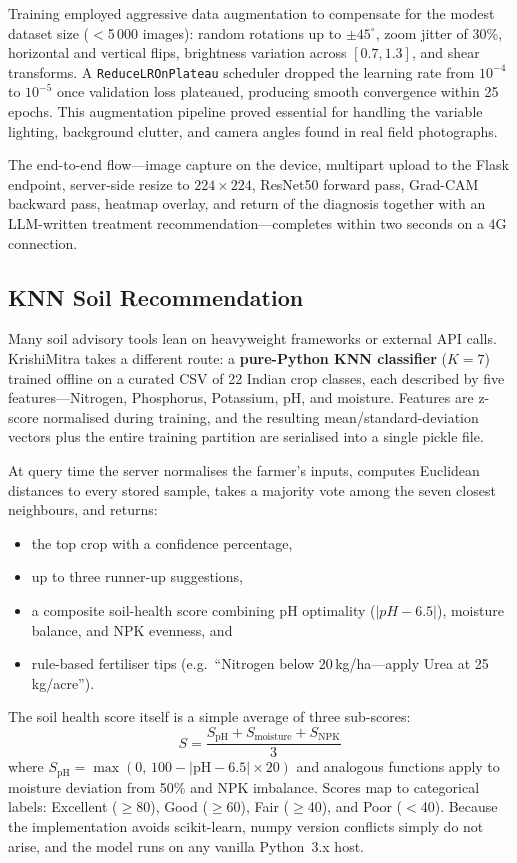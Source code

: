 \documentclass[conference]{IEEEtran}
\begin{document}
Training employed aggressive data augmentation to compensate for the modest dataset size ($<$5\,000
images): random rotations up to $\pm45^\circ$, zoom jitter of 30\%, horizontal and vertical flips,
brightness variation across $[0.7, 1.3]$, and shear transforms. A \texttt{ReduceLROnPlateau}
scheduler dropped the learning rate from $10^{-4}$ to $10^{-5}$ once validation loss plateaued,
producing smooth convergence within 25 epochs. This augmentation pipeline proved essential for
handling the variable lighting, background clutter, and camera angles found in real field
photographs.

The end-to-end flow---image capture on the device, multipart upload to the Flask endpoint,
server-side resize to $224\times224$, ResNet50 forward pass, Grad-CAM backward pass, heatmap
overlay, and return of the diagnosis together with an LLM-written treatment
recommendation---completes within two seconds on a 4G connection.

\subsection{KNN Soil Recommendation}
Many soil advisory tools lean on heavyweight frameworks or
external API calls. KrishiMitra takes a different route: a \textbf{pure-Python KNN classifier}
($K\!=\!7$) trained offline on a curated CSV of 22 Indian crop classes, each described by five
features---Nitrogen, Phosphorus, Potassium, pH, and moisture. Features are z-score normalised during
training, and the resulting mean/standard-deviation vectors plus the entire training partition are
serialised into a single pickle file.

At query time the server normalises the farmer's inputs, computes Euclidean distances to every
stored sample, takes a majority vote among the seven closest neighbours, and returns:
\begin{itemize}
  \item the top crop with a confidence percentage,
  \item up to three runner-up suggestions,
  \item a composite soil-health score combining pH optimality
  ($|pH-6.5|$), moisture balance, and NPK evenness, and
  \item rule-based fertiliser tips (e.g.\ ``Nitrogen below
  20\,kg/ha---apply Urea at 25\,kg/acre'').
\end{itemize}

The soil health score itself is a simple average of three sub-scores:
\begin{equation}
S = \frac{S_{\text{pH}} + S_{\text{moisture}} + S_{\text{NPK}}}{3}
\end{equation}
where $S_{\text{pH}} = \max(0,\, 100 - |\text{pH} - 6.5| \times 20)$
and analogous functions apply to moisture deviation from 50\%
and NPK imbalance. Scores map to categorical labels: Excellent
($\geq$80), Good ($\geq$60), Fair ($\geq$40), and Poor ($<$40).
Because the implementation avoids scikit-learn, numpy version conflicts simply do not arise, and the
model runs on any vanilla Python~3.x host.
\end{document}
